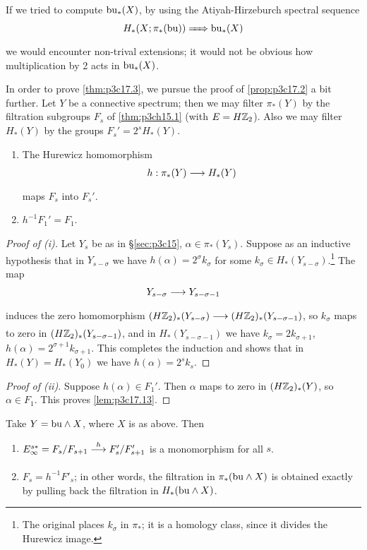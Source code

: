 \documentclass[../main]{subfiles}
\begin{document}
\begin{remark*}
If we tried to compute $\mathrm{bu}_\ast(X)$, by using the Atiyah-Hirzeburch spectral sequence \[H_\ast(X; \pi_\ast(\mathrm{bu})) \xRightarrow{\phantom{.....}} \mathrm{bu}_\ast(X)\] we would encounter non-trival extensions; it would not be obvious how multiplication by 2 acts in $\mathrm{bu}_\ast(X)$. 
\end{remark*} 

In order to prove \ref{thm:p3c17.3}, we pursue the proof of \ref{prop:p3c17.2} a bit further. Let $Y$ be a connective spectrum; then we may filter $\pi_\ast(Y)$ by the filtration subgroups $F_s$ of \ref{thm:p3ch15.1} (with $E = H \mathbb{Z}_2$). Also we may filter $H_\ast(Y)$ by the groups $F_s' = 2^s H_\ast(Y)$.

\begin{lemma}
\label{lem:p3c17.13}
\begin{enumerate}
    \item[(i)] The Hurewicz homomorphism \[h : \pi_\ast(Y) \lar{} H_\ast(Y)\] maps $F_s$ into $F_s'$.
    \item[(ii)] $h^{-1} F_1' = F_1$.
\end{enumerate}
\end{lemma}

\begin{proof}[Proof of (i)]
Let $Y_s$ be as in \S\ref{sec:p3c15}, $\alpha\in\pi_\ast(Y_s)$. Suppose as an inductive hypothesis that in $Y_{s-\sigma}$ we have $h(\alpha)=2^\sigma k_\sigma$ for some $k_\sigma\in H_\ast(Y_{s-\sigma})$.\footnote{The original places $k_\sigma$ in $\pi_\ast$; it is a homology class, since it divides the Hurewicz image.} The map \[Y_{s-\sigma}\lar{}Y_{s-\sigma-1}\] induces the zero homomorphism $(H\bbZ_2)_\ast(Y_{s-\sigma})\lar{}(H\bbZ_2)_\ast(Y_{s-\sigma-1})$, so $k_\sigma$ maps to zero in $(H\mathbb{Z}_2)_\ast(Y_{s-\sigma-1})$, and in $H_\ast(Y_{s-\sigma-1})$ we have $k_\sigma=2k_{\sigma+1}$, $h(\alpha)=2^{\sigma+1}k_{\sigma+1}$. This completes the induction and shows that in $H_\ast(Y)=H_\ast(Y_0)$ we have $h(\alpha)=2^sk_s$.
\end{proof}

\begin{proof}[Proof of (ii)]
Suppose $h(\alpha) \in F_1'$. Then $\alpha$ maps to zero in $(H\mathbb{Z}_2)_\ast(Y)$, so $\alpha \in F_1$. This proves \ref{lem:p3c17.13}. 
\end{proof}

\begin{lemma}
\label{lem:p3c17.14}
Take $Y = \mathrm{bu} \wedge X$, where $X$ is as above. Then 

\begin{enumerate}
    \item[(i)] $E_\infty^{s\ast} = F_s/F_{s + 1} \lar{h} F_s'/F'_{s + 1}$ is a monomorphism for all $s$.
    \item[(ii)] $F_s = h^{-1} F'_s$; in other words, the filtration in $\pi_\ast(\mathrm{bu} \wedge X)$ is obtained exactly by pulling back the filtration in $H_\ast(\mathrm{bu} \wedge X)$.
\end{enumerate}
\end{lemma}
\end{document}
